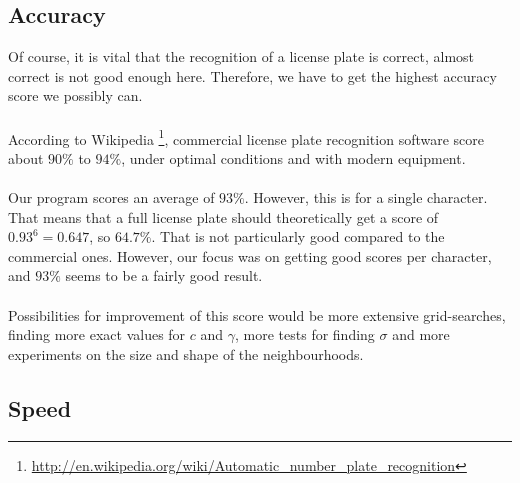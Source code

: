 \documentclass[a4paper]{article}
\begin{document}
\subsection{Accuracy}

Of course, it is vital that the recognition of a license plate is correct,
almost correct is not good enough here. Therefore, we have to get the highest
accuracy score we possibly can.\\
\\ According to Wikipedia
\footnote{
\url{http://en.wikipedia.org/wiki/Automatic_number_plate_recognition}},
commercial license plate recognition software score about $90\%$ to $94\%$,
under optimal conditions and with modern equipment.\\
\\
Our program scores an average of $93\%$. However, this is for a single
character. That means that a full license plate should theoretically
get a score of $0.93^6 = 0.647$, so $64.7\%$. That is not particularly
good compared to the commercial ones. However, our focus was on getting
good scores per character, and $93\%$ seems to be a fairly good result.\\
\\
Possibilities for improvement of this score would be more extensive
grid-searches, finding more exact values for $c$ and $\gamma$, more tests
for finding $\sigma$ and more experiments on the size and shape of the 
neighbourhoods.

\subsection{Speed}
\end{document}
